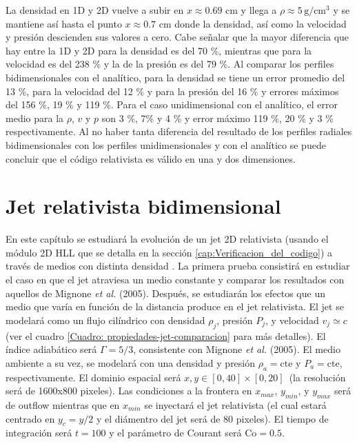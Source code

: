 \documentclass[12pt,a4paper]{book}
\begin{document}
La densidad en 1D y 2D vuelve a subir
en $x \approx 0.69$ cm y llega a $\rho \approx 5 \,  \text{g}/ \text{cm}^3$ y 
se mantiene así hasta el punto $x \approx 0.7$ cm 
donde la densidad, así como la velocidad y presión descienden sus valores a cero.
Cabe señalar que la mayor diferencia que hay entre la 1D y 2D para la densidad es del 70 \%, mientras que para la 
velocidad es del 238 \% y la de la presión es del 79 \%.
Al comparar los perfiles bidimensionales con el analítico, para la densidad se tiene un error promedio del
13 \%, para la velocidad del 12 \% y para la presión del 16 \% y errores máximos del 156 \%, 19 \% y 119 \%. 
Para el caso unidimensional con el analítico, el error medio para la $\rho$, $v$ y $p$ son 
3 \%,  7\% y  4 \% y error máximo 119 \%, 20 \% y 3 \% respectivamente.
Al no haber tanta diferencia del resultado de los perfiles radiales bidimensionales con 
los perfiles unidimensionales y con el analítico se puede concluir que el código relativista es válido
en una y dos dimensiones.





\chapter{Jet relativista bidimensional}

En este capítulo se estudiará la evolución de un jet 2D relativista (usando el módulo 2D HLL que se detalla en la 
sección \ref{cap:Verificacion_del_codigo}) a {\color {red} través de medios con distinta densidad }. 
La primera prueba consistirá en estudiar el caso en que el jet atraviesa un 
medio constante y  comparar los resultados con aquellos de Mignone \emph{et al.} (2005). 
Después, se estudiarán los efectos que un {\color {red} medio que varía en función de la distancia} produce en el jet relativista.
El jet se modelará como un flujo cilíndrico con densidad $\rho_j$, presión $P_j$,  y velocidad $v_j \simeq c$ 
{\color {red} (ver el cuadro \ref{Cuadro: propiedades-jet-comparacion} para más detalles)}. El índice adiabático será $\Gamma = 5/3$, 
consistente con Mignone 
\emph{et al.} (2005). El medio ambiente a su vez, 
se modelará con una densidad y presión $\rho_a = \mathrm{cte}$ y $P_a = \mathrm{cte}$, respectivamente. 
El dominio espacial será $x, y \in [0,40]\times[0,20] \,$  (la resolución será  de {\color {red} 1600x800} pixeles). 
Las condiciones a la frontera en $x_{max}$, $y_{min}$, y $y_{max}$ será de outflow mientras que en $x_{min}$ se 
inyectará el jet relativista (el cual estará centrado en $y_c = y/2$ y el 
diámentro del jet será de 80 pixeles). 
El tiempo de integración será $t = 100$  y el parámetro de Courant será $\text{Co} = 0.5$.
\end{document}
